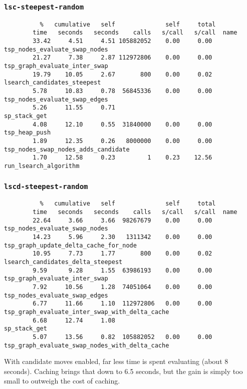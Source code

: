 \documentclass[14pt]{article}
\begin{document}
\subsubsection*{\texttt{lsc-steepest-random}}
\vspace{-6mm}
\begin{listing}[H]
	\begin{verbatim}
		  %   cumulative   self              self     total
		time   seconds   seconds    calls   s/call   s/call  name
		33.42     4.51     4.51 105882052    0.00     0.00  tsp_nodes_evaluate_swap_nodes
		21.27     7.38     2.87 112972806    0.00     0.00  tsp_graph_evaluate_inter_swap
		19.79    10.05     2.67       800    0.00     0.02  lsearch_candidates_steepest
		5.78     10.83     0.78  56845336    0.00     0.00  tsp_nodes_evaluate_swap_edges
		5.26     11.55     0.71                             sp_stack_get
		4.08     12.10     0.55  31840000    0.00     0.00  tsp_heap_push
		1.89     12.35     0.26   8000000    0.00     0.00  tsp_nodes_swap_nodes_adds_candidate
		1.70     12.58     0.23         1    0.23    12.56  run_lsearch_algorithm
	\end{verbatim}
\end{listing}
\vspace{-15mm}
\subsubsection*{\texttt{lscd-steepest-random}}
\vspace{-6mm}
\begin{listing}[H]
	\begin{verbatim}
		  %   cumulative   self              self     total
		time   seconds   seconds    calls   s/call   s/call  name
		22.64     3.66     3.66  98267679    0.00     0.00  tsp_nodes_evaluate_swap_nodes
		14.23     5.96     2.30   1311342    0.00     0.00  tsp_graph_update_delta_cache_for_node
		10.95     7.73     1.77       800    0.00     0.02  lsearch_candidates_delta_steepest
		9.59      9.28     1.55  63986193    0.00     0.00  tsp_graph_evaluate_inter_swap
		7.92     10.56     1.28  74051064    0.00     0.00  tsp_nodes_evaluate_swap_edges
		6.77     11.66     1.10  112972806   0.00     0.00  tsp_graph_evaluate_inter_swap_with_delta_cache
		6.68     12.74     1.08                             sp_stack_get
		5.07     13.56     0.82  105882052   0.00     0.00  tsp_graph_evaluate_swap_nodes_with_delta_cache
	\end{verbatim}
\end{listing}
\noindent
With candidate moves enabled, far less time is spent evaluating (about 8
seconds). Caching brings that down to 6.5 seconds, but the gain is simply
too small to outweigh the cost of caching.
\end{document}
